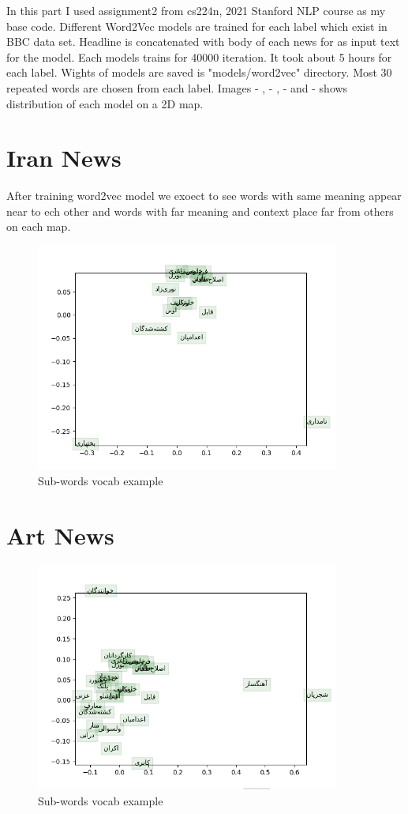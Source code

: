 \label{chapter:word2vec}


In this part I used assignment2 from cs224n, 2021 Stanford NLP course as my base code. Different Word2Vec models are trained for each label which exist in BBC data set. Headline is concatenated with body of each news for as input text for the model. Each models trains for 40000 iteration. It took about 5 hours for each label. Wights of models are saved is "models/word2vec" directory. Most 30 repeated words are chosen from each label. Images - , - , - and - shows distribution of each model on a 2D map. 


\section{Iran News}
After training word2vec model we exoect to see words with same meaning appear near to ech other and words with far meaning and context place far from others on each map.
\begin{figure}[h]
	\centering
	\includegraphics[width=10cm]{../reports/word2vec/word_vectors_ايران.png}
	\caption{Sub-words vocab example}
	\label{fig:word2veciran}
\end{figure}


\section{Art News}
\begin{figure}[h]
	\centering
	\includegraphics[width=10cm]{../reports/word2vec/word_vectors_هنر.png}
	\caption{Sub-words vocab example}
	\label{fig:word2vecart}
\end{figure}


